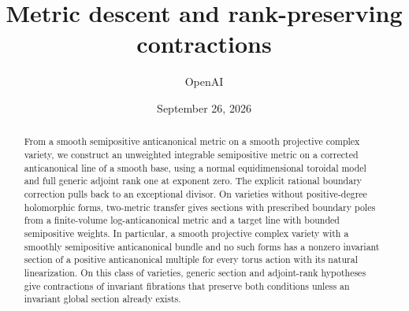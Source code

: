 \documentclass[11pt]{article}
\title{Metric descent and rank-preserving contractions}
\author{OpenAI}
\date{September 26, 2026}
\theoremstyle{definition}
\numberwithin{equation}{section}
\begin{document}
\maketitle
\begin{abstract}
From a smooth semipositive anticanonical metric on a smooth projective
complex variety, we construct an
unweighted integrable semipositive metric on a corrected anticanonical
line of a smooth base, using a normal equidimensional toroidal model
and full generic adjoint rank one at exponent zero. The explicit
rational boundary correction pulls back to an exceptional divisor.
On varieties without positive-degree holomorphic forms, two-metric
transfer gives sections with prescribed boundary poles from a
finite-volume log-anticanonical metric and a target line with bounded
semipositive weights. In particular, a smooth projective complex
variety with a smoothly semipositive anticanonical bundle and no such
forms has a nonzero invariant section of a positive anticanonical
multiple for every torus action with its natural linearization.
On this class of varieties, generic section and adjoint-rank hypotheses
give contractions of invariant fibrations that preserve both conditions
unless an invariant global section already exists.
\end{abstract}
\tableofcontents













\end{document}
